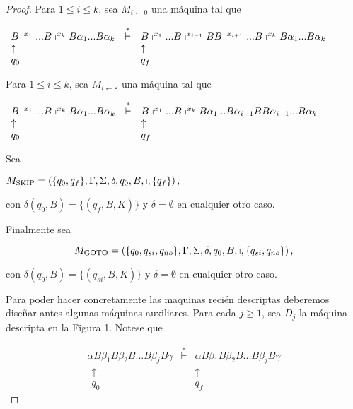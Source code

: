 \begin{proof}
		\bigskip

    \noindent Para $1\leq i\leq k$, sea $M_{i\leftarrow 0}$ una máquina tal que

		\bigskip

    $\displaystyle \begin{array}{lcl} B\shortmid ^{x_{1}}...B\shortmid ^{x_{k}}B\alpha _{1}...B\alpha _{k} &
    \overset{\ast }{\vdash } & B\shortmid ^{x_{1}}...B\shortmid ^{x_{i-1}}BB\shortmid ^{x_{i+1}}...B\shortmid
    ^{x_{k}}B\alpha _{1}...B\alpha _{k} \\ \uparrow & & \uparrow \\ q_{0} & & q_{f} \end{array} $

		\bigskip

    \noindent Para $1\leq i\leq k$, sea $M_{i\leftarrow \varepsilon }$ una máquina tal que

		\bigskip

    $\displaystyle \begin{array}{lcl} B\shortmid ^{x_{1}}...B\shortmid ^{x_{k}}B\alpha _{1}...B\alpha _{k} &
    \overset{\ast }{\vdash } & B\shortmid ^{x_{1}}...B\shortmid
    ^{x_{k}}B\alpha _{1}...B\alpha _{i-1}BB\alpha _{i+1}...B\alpha _{k} \\
    \uparrow & & \uparrow \\ q_{0} & & q_{f} \end{array} $

		\bigskip

    \noindent Sea

    $\displaystyle M_{\mathrm{SKIP}}=\left( \{q_{0},q_{f}\},\Gamma ,\Sigma ,\delta ,q_{0},B,\shortmid ,\{q_{f}\}\right) ,$

		\noindent con $\delta (q_{0},B)=\{(q_{f},B,K)\}$ y $\delta =\emptyset $ en cualquier otro caso.

		\bigskip

    \noindent Finalmente sea

		\[
    \displaystyle M_{\mathrm{GOTO}}=\left( \{q_{0},q_{si},q_{no}\},\Gamma ,\Sigma ,\delta ,q_{0},B,\shortmid ,\{q_{si},q_{no}\}\right) ,
    \]

    \noindent con $\delta (q_{0},B)=\{(q_{si},B,K)\}$ y $\delta =\emptyset $ en cualquier otro caso.

		Para poder hacer concretamente las maquinas recién descriptas deberemos diseñar antes algunas máquinas auxiliares.
		Para cada $j\geq 1$, sea $D_{j}$ la máquina descripta en la Figura 1. Notese que

		\[
		\displaystyle \begin{array}{lcr} \alpha B\beta _{1}B\beta _{2}B...B\beta _{j}B\gamma & \overset{\ast }{\vdash } & \alpha B\beta _{1}B\beta _{2}B...B\beta _{j}B\gamma \\
    \ \ \uparrow & & \uparrow \ \ \\ \ \ q_{0} & & q_{f}\ \ \end{array}
		\]


\end{proof}
